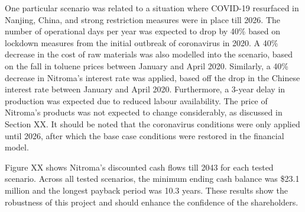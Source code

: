 One particular scenario was related to a situation where COVID-19 resurfaced in Nanjing, China, and strong restriction measures were in place till 2026. The number of operational days per year was expected to drop by 40\% based on lockdown measures from the initial outbreak of coronavirus in 2020. A 40\% decrease in the cost of raw materials was also modelled into the scenario, based on the fall in toluene prices between January and April 2020. Similarly, a 40\% decrease in Nitroma’s interest rate was applied, based off the drop in the Chinese interest rate between January and April 2020. Furthermore, a 3-year delay in production was expected due to reduced labour availability. The price of Nitroma’s products was not expected to change considerably, as discussed in Section XX. It should be noted that the coronavirus conditions were only applied until 2026, after which the base case conditions were restored in the financial model.

Figure XX shows Nitroma’s discounted cash flows till 2043 for each tested scenario. Across all tested scenarios, the minimum ending cash balance was \$23.1 million and the longest payback period was 10.3 years. These results show the robustness of this project and should enhance the confidence of the shareholders.
